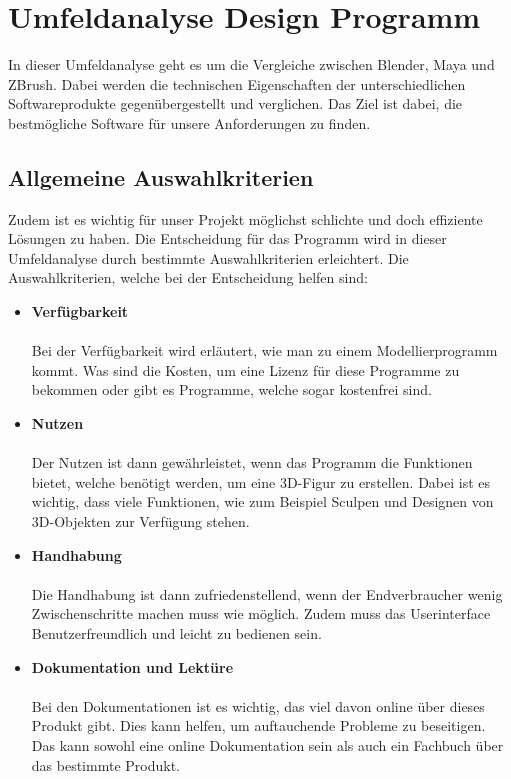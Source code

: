 
\section{Umfeldanalyse Design Programm}
In dieser Umfeldanalyse geht es um die Vergleiche zwischen Blender, Maya und ZBrush. Dabei werden die technischen Eigenschaften der unterschiedlichen Softwareprodukte gegenübergestellt und verglichen. Das Ziel ist dabei, die bestmögliche Software für unsere Anforderungen zu finden.


\subsection{Allgemeine Auswahlkriterien}
Zudem ist es wichtig für unser Projekt möglichst schlichte und doch effiziente Lösungen zu haben. Die Entscheidung für das Programm wird in dieser Umfeldanalyse durch bestimmte Auswahlkriterien erleichtert. Die Auswahlkriterien, welche bei der Entscheidung helfen sind: 

\begin{itemize}
    \item \textbf{Verfügbarkeit} \\\\ Bei der Verfügbarkeit wird erläutert, wie man zu einem Modellierprogramm kommt. Was sind die Kosten, um eine Lizenz für diese Programme zu bekommen oder gibt es Programme, welche sogar kostenfrei sind.
    \item \textbf{Nutzen} \\\\Der Nutzen ist dann gewährleistet, wenn das Programm die Funktionen bietet, welche benötigt werden, um eine 3D-Figur zu erstellen. Dabei ist es wichtig, dass viele Funktionen, wie zum Beispiel Sculpen und Designen von 3D-Objekten zur Verfügung stehen.
    \item \textbf{Handhabung} \\\\Die Handhabung ist dann zufriedenstellend, wenn der Endverbraucher wenig Zwischenschritte machen muss wie möglich. Zudem muss das Userinterface Benutzerfreundlich und leicht zu bedienen sein.
    \item \textbf{Dokumentation und Lektüre} \\\\ Bei den Dokumentationen ist es wichtig, das viel davon online über dieses Produkt gibt. Dies kann helfen, um auftauchende Probleme zu beseitigen. Das kann sowohl eine online Dokumentation sein als auch ein Fachbuch über das bestimmte Produkt.
\end{itemize}




